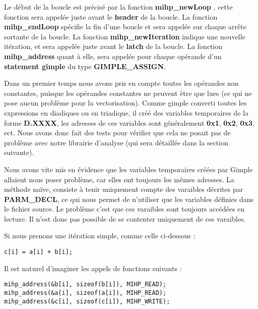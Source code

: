 \documentclass[12pt,french]{article}
\begin{document}
Le début de la boucle est précisé par la fonction
\textbf{mihp\_newLoop}
, cette fonction sera appelée juste avant le \textbf{header} de la boucle. La fonction \textbf{mihp\_endLoop} spécifie la fin d'une boucle et sera appelée sur chaque arrête sortante de la boucle. La fonction \textbf{mihp\_newIteration} indique une nouvelle itération, et sera appelée juste avant le
\textbf{latch} de la boucle. La fonction \textbf{mihp\_address} quant à elle, sera appelée pour chaque opérande d'un \textbf{statement gimple} du type \textbf{GIMPLE\_ASSIGN}.

Dans un premier temps nous avons pris en compte toutes les opérandes non constantes, puisque les opérandes constantes ne peuvent être que lues (ce qui ne pose aucun problème pour la vectorisation). Comme gimple converti toutes les expressions en diadiques ou en triadique, il créé des variables temporaires de la forme \textbf{D.XXXX}, les adresses de ces variables sont généralement \textbf{0x1}, \textbf{0x2}, \textbf{0x3}, ect. Nous avons donc fait des tests pour vérifier que cela ne posait pas de problème avec notre librairie d'analyse (qui sera détaillée dans la section suivante).

Nous avons vite mis en évidence que les variables temporaires créées par Gimple allaient nous poser problème, car elles ont toujours les mêmes adresses. La méthode naïve, consiste à tenir uniquement compte des varaibles décrites par \textbf{PARM\_DECL}, ce qui nous permet de n'utiliser que les variables définies dans le fichier source. Le problème c'est que ces varaibles sont toujours accédées en lecture. Il n'est donc pas possible de se contenter uniquement de ces varaibles.

Si nous prenons une itération simple, comme celle ci-dessous :

\begin{center}
\color{blue}
\begin{lstlisting}
c[i] = a[i] + b[i];
\end{lstlisting}
\end{center}

Il est naturel d'imaginer les appels de fonctions suivants :

\begin{center}
\color{blue}
\begin{lstlisting}
mihp_address(&b[i], sizeof(b[i]), MIHP_READ);
mihp_address(&a[i], sizeof(a[i]), MIHP_READ);
mihp_address(&c[i], sizeof(c[i]), MIHP_WRITE);
\end{lstlisting}
\end{center}
\end{document}
